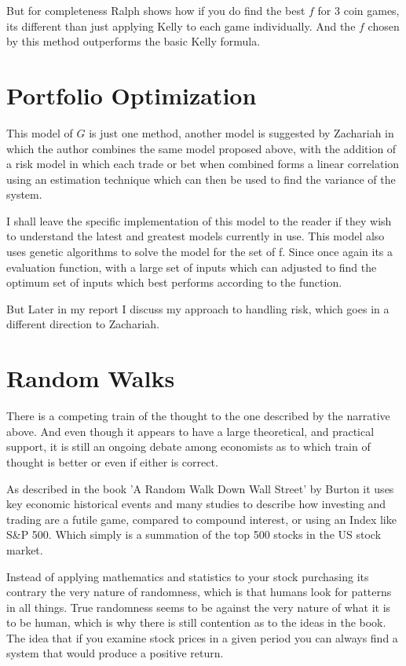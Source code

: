 \documentclass[12pt]{article}
\begin{document}
But for completeness Ralph\cite{Ralph} shows how if you do find the best \(f\) for 3 coin
games, its different than just applying Kelly to each game individually. And the \(f\)
chosen by this method outperforms the basic Kelly formula.

\section{Portfolio Optimization}

This model of \(G\) is just one method, another model is suggested by Zachariah
\cite{Zachariah} in which the author combines the same model proposed above, with the 
addition of a risk model in which each trade or bet when combined forms a linear correlation 
using an estimation technique which can then be used to find the variance of the system.

I shall leave the specific implementation of this model to the reader if they wish to 
understand the latest and greatest models currently in use. This model also uses genetic 
algorithms to solve the model for the set of f. Since once again its a evaluation function, 
with a large set of inputs which can adjusted to find the optimum set of inputs which best 
performs according to the function.

But Later in my report I discuss my approach to handling risk, which goes in a different
direction to Zachariah.

\section{Random Walks}

There is a competing train of the thought to the one described by the narrative above. And 
even though it appears to have a large theoretical, and practical support, it is still an 
ongoing debate among economists as to which train of thought is better or even if either is 
correct.

As described in the book 'A Random Walk Down Wall Street' by Burton\cite{Burton} it uses key 
economic historical events and many studies to describe how investing and trading are a 
futile game, compared to compound interest, or using an Index like S\&P 500. Which simply is 
a summation of the top 500 stocks in the US stock market.

Instead of applying mathematics and statistics to your stock purchasing its contrary the 
very nature of randomness, which is that humans look for patterns in all things. True 
randomness seems to be against the very nature of what it is to be human, which is why there 
is still contention as to the ideas in the book. The idea that if you examine stock prices 
in a given period you can always find a system that would produce a positive return.
\end{document}
